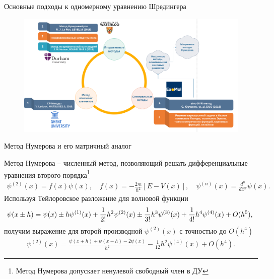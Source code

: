 \documentclass[10pt,pdf,hyperref={unicode},xcolor=dvipsnames]{beamer}
\newcommand{\lsq}{\left[}
\newcommand{\rsq}{\right]}
\newcommand{\psip}[1]{\psi^{(#1)}(x)}
\begin{document}
\begin{frame}{Основные подходы к одномерному уравнению Шредингера}
    \centering
   
    \begin{figure}[H]
        \includegraphics[width=\linewidth]{./pictures/diagram.png}
    \end{figure}
\end{frame}

\begin{frame}{Метод Нумерова и его матричный аналог}
    \begin{block}{}
        Метод Нумерова -- численный метод, позволяющий решать дифференциальные уравнения второго порядка\footnote{Метод Нумерова допускает ненулевой свободный член в ДУ}
        \begin{gather}
            \psip{2} = f(x) \psi(x), \quad f(x) = -\frac{2 m}{\hbar^2}\lsq E - V(x) \rsq, \quad \psip{n} = \frac{d^n}{dx^n} \psi(x).
        \end{gather}
        Используя Тейлоровское разложение для волновой функции
        \begin{gather}
            \hspace*{-0.1cm}
            \psi(x \pm h) = \psi(x) \pm h \psip{1} + \frac{1}{2!} h^2 \psip{2} \pm \frac{1}{3!} h^3 \psip{3} + \frac{1}{4!} h^4 \psip{4} + O(h^5), \notag
        \end{gather}
        получим выражение для второй производной $\psip{2}$ с точностью до $O(h^4)$
        \begin{gather}
            \psip{2} = \frac{ \psi(x+h) + \psi(x-h) - 2\psi(x) }{ h^2 } - \frac{1}{12} h^2 \psip{4} + O ( h^4 ).
        \end{gather}
    \end{block}
\end{frame}
\end{document}
